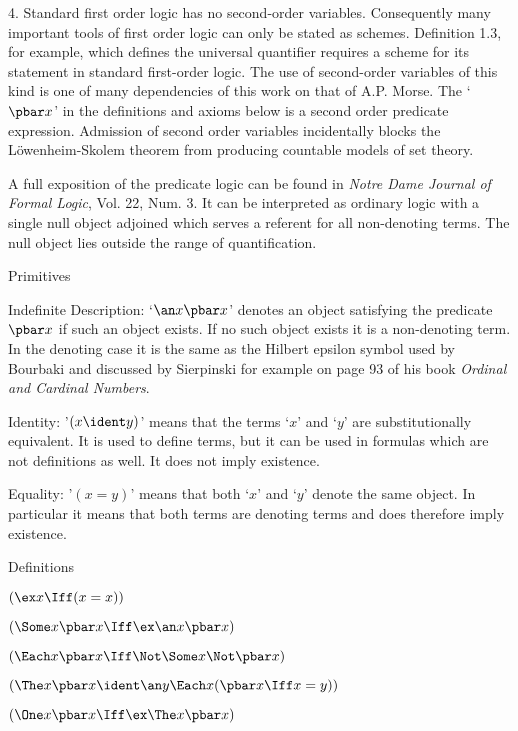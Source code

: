 4.  Standard first order logic has no second-order variables.  
Consequently many important tools of first order logic can only be 
stated as schemes.  Definition 1.3, for example, which defines the
universal quantifier requires a scheme for its statement in
standard first-order logic.   The use of second-order variables of this
kind is one of many dependencies of this work on that of A.P. Morse.
  The `$\pbar x$' in the definitions and
axioms below is a second order predicate expression.  
Admission of second order variables incidentally
blocks the L\"owenheim-Skolem theorem from producing countable
models of set theory. 

A full exposition of the predicate logic
can be found in {\it Notre Dame Journal of Formal Logic}, Vol. 22, Num. 3.
It can be interpreted as ordinary logic with a single null object adjoined
which serves a referent for all non-denoting terms.  The null object
lies outside the range of quantification. 
\lineb


\noindent{}Primitives

Indefinite Description:  
`$\an x \pbar x$' denotes an object satisfying the predicate $\pbar x$ if such
an object exists.  If no such object exists it is a non-denoting term.  
In the denoting case it is the same as the Hilbert epsilon symbol used 
by Bourbaki and discussed by Sierpinski for example on page 93 of his
book {\it Ordinal and Cardinal Numbers}.  


Identity:
'$(x \ident y)$' means that 
the terms `$x$' and `$y$' are substitutionally equivalent.  It is used
to define terms, but it can be used in formulas which are 
not definitions as well.
It does not imply existence.

Equality:
'$(x = y)$'  means that both `$x$' and `$y$' denote
the same object.  In particular it means that both terms are denoting terms
and does therefore imply existence.

\lineb


\noindent{}Definitions

 $(\ex x \Iff (x = x))$

 $(\Some x \pbar x \Iff \ex \an x \pbar x)$

 $(\Each x \pbar x \Iff \Not \Some x \Not \pbar x)$

 $(\The x \pbar x \ident \an y \Each x(\pbar x \Iff x = y))$

  $(\One x \pbar x \Iff \ex \The x \pbar x)$ 

